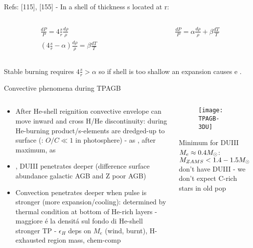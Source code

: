 \begin{frame}{}
Refs: [115], [155] - In a shell of thickness s located at r:
\begin{columns}[T]\begin{column}{0.5\textwidth}
\begin{align*}
&\frac{dP}{P}=4\frac{s}{r}\frac{d\rho}{\rho}\\
&(4\frac{s}{r}-\alpha)\frac{d\rho}{\rho}=\beta\frac{dT}{T}
\end{align*} 
\end{column}
\begin{column}{0.5\textwidth}
\begin{align*}
&\frac{dP}{P}=\alpha\frac{d\rho}{\rho}+\beta\frac{dT}{T}
\end{align*} 
\end{column}\end{columns}
Stable burning requires $4\frac{s}{r}>\alpha$ so if shell is too shallow an expansion causes \xdiminuisce{\rho} e .
\end{frame}

\begin{frame}{Convective phenomena during TPAGB}
\begin{columns}[T]
\begin{column}{0.40\textwidth}
\begin{itemize}
\item After He-shell reignition convective envelope can move inward and cross H/He discontinuity: during  He-burning product/s-elements are dredged-up to surface (: $O/C\ll1$ in photosphere) -  as , after maximum,  as 
\item {}, DUIII penetrates deeper (difference surface abundance galactic AGB and Z poor AGB)
\item Convection penetrates deeper when pulse is stronger (more expansion/cooling): determined by thermal condition at bottom of He-rich layers -  maggiore \'e la densit\'a sul fondo di He-shell stronger TP - $\epsilon_H$ deps on $M_e$ (wind, burnt), H-exhausted region mass, chem-comp
\end{itemize}
\end{column}
\begin{column}{0.48\textwidth}
\begin{figure}[!ht]
\texttt{[image: TPAGB-3DU]}\label{fig:TPAGB-3DU}
\end{figure}
Minimum for DUIII $M_e\approx0.4M_{\odot}$: $M_{ZAMS}<1.4-1.5M_{\odot}$ don't have DUIII - we don't expect C-rich stars in old pop
\end{column}\end{columns}
\end{frame}

